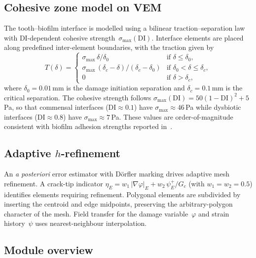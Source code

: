 \documentclass[smallextended]{svjour3}
\newcommand{\DI}{\mathrm{DI}}
\newcommand{\pf}{\varphi}
\begin{document}
\subsection{Cohesive zone model on VEM}
\label{sec:vem:czm}

The tooth--biofilm interface is modelled using a bilinear
traction--separation law~\cite{Park2009} with DI-dependent cohesive
strength~$\sigma_\mathrm{max}(\DI)$.
Interface elements are placed along predefined inter-element boundaries,
with the traction given by
\begin{equation}
  T(\delta) = \begin{cases}
    \sigma_\mathrm{max}\,\delta / \delta_0 & \text{if } \delta \le \delta_0, \\
    \sigma_\mathrm{max}\,(\delta_c - \delta)/(\delta_c - \delta_0) & \text{if } \delta_0 < \delta \le \delta_c, \\
    0 & \text{if } \delta > \delta_c,
  \end{cases}
  \label{eq:czm}
\end{equation}
where $\delta_0 = 0.01$\,mm is the damage initiation separation and
$\delta_c = 0.1$\,mm is the critical separation.
The cohesive strength follows $\sigma_\mathrm{max}(\DI) = 50(1-\DI)^2
+ 5$\,Pa, so that commensal interfaces ($\DI \approx 0.1$) have
$\sigma_\mathrm{max} \approx 46$\,Pa while dysbiotic interfaces
($\DI \approx 0.8$) have $\sigma_\mathrm{max} \approx 7$\,Pa.
These values are order-of-magnitude consistent with biofilm adhesion
strengths reported in~\cite{Ohashi2009}.

\subsection{Adaptive $h$-refinement}
\label{sec:vem:adaptive}

An \emph{a posteriori} error estimator with D\"orfler marking drives
adaptive mesh refinement.
A crack-tip indicator
$\eta_E = w_1\,|\nabla \pf|_E + w_2\,\psi^+_E / G_c$
(with $w_1 = w_2 = 0.5$) identifies elements requiring refinement.
Polygonal elements are subdivided by inserting the centroid and edge
midpoints, preserving the arbitrary-polygon character of the mesh.
Field transfer for the damage variable~$\pf$ and strain history~$\psi$
uses nearest-neighbour interpolation.

\subsection{Module overview}
\label{sec:vem:overview}
\end{document}
